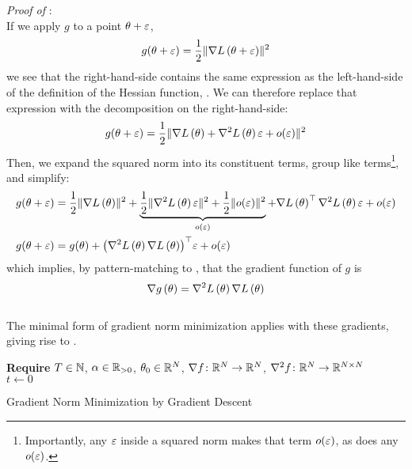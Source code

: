 \documentclass[../../thesis.tex]{subfiles}
\begin{document}
\noindent \textit{Proof of }:\\
If we apply $g$ to a point $\theta + \varepsilon$,
\begin{equation}
	g(\theta + \varepsilon) = \frac{1}{2}\lVert\nabla L\left(\theta + \varepsilon\right)\rVert^2
\end{equation}
\noindent we see that the right-hand-side
contains the same expression as the left-hand-side
of the definition of the Hessian function,
.
We can therefore replace that expression
with the decomposition on the right-hand-side:
\begin{equation}
	g(\theta + \eps) = \frac{1}{2}\snorm{%
	\grad{L}{\theta} + \hess{L}{\theta}\epsilon + o(\epsilon)}
\end{equation}
\noindent Then, we expand the squared norm into its constituent terms,
group like terms\footnote{%
	Importantly, any $\varepsilon$ inside a squared norm makes that term $o(\varepsilon)$,
as does any $o(\varepsilon)$.},
and simplify:
\begin{align}
	g(\theta + \varepsilon) &= \frac{1}{2}\lVert\nabla L\left(\theta\right)\rVert^2
	+ \underbrace{\frac{1}{2}\lVert\nabla^2L\left(\theta\right)\varepsilon\rVert^2
	+ \frac{1}{2}\lVert o(\varepsilon)\rVert^2}_{o(\varepsilon)}
	+ \nabla L\left(\theta\right)^\top\nabla^2L\left(\theta\right)\varepsilon
	+ o(\varepsilon)\\
	g(\theta + \varepsilon) &= g(\theta)
	+ {\left(\nabla^2L\left(\theta\right)\nabla L\left(\theta\right)\right)}^\top\varepsilon
	+ o(\varepsilon)
\end{align}
\noindent which implies,
by pattern-matching to ,
that the gradient function of $g$ is
\begin{equation}\equationlabel{gnm-grad}
	\grad{g}{\theta} = \hess{L}{\theta}\grad{L}{\theta}
\end{equation}
\QED\\

The minimal form of gradient norm minimization
applies  with these gradients,
giving rise to .
\\
\begin{algorithm}[H]
    \SetAlgoLined{}
    \textbf{Require}
    $T\in \mathbb{N}$, $\alpha \in \mathbb{R}_{>0}$, $\theta_0 \in \mathbb{R}^N$,
    $\nabla{f}\colon\mathbb{R}^N\to\mathbb{R}^N$,
    $\nabla^2{f}\colon\mathbb{R}^N\to\mathbb{R}^{N\times N}$\\
    $t \leftarrow 0$\\
    \caption{Gradient Norm Minimization by Gradient Descent}
\end{algorithm}
\end{document}
